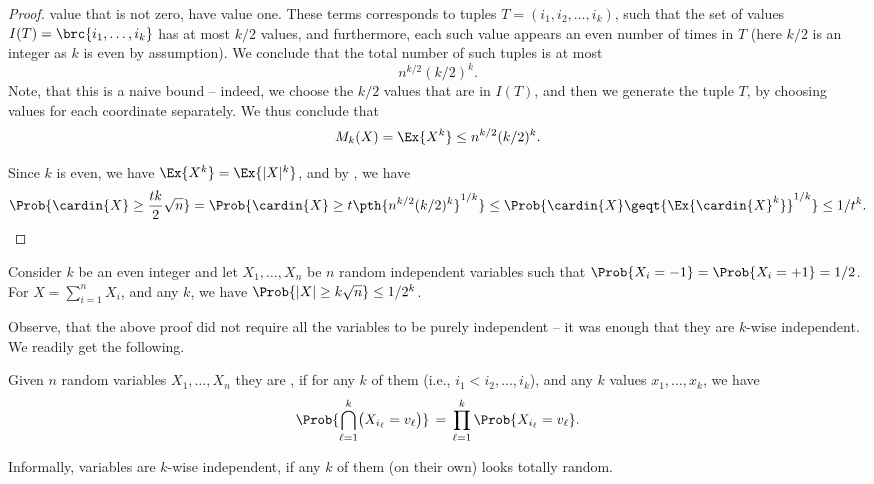 \begin{proof}
    value that is not zero, have value one. These terms corresponds to
    tuples $T = (i_1, i_2, \ldots, i_k)$, such that the set of values
    $I(T) = \brc{ i_1, \ldots, i_k}$ has at most $k/2$ values, and
    furthermore, each such value appears an even number of times in
    $T$ (here $k/2$ is an integer as $k$ is even by assumption). We
    conclude that the total number of such tuples is at most
    \[
        n^{k/2} (k/2)^k.
    \]
    Note, that this is a naive bound -- indeed, we choose the $k/2$
    values that are in $I(T)$, and then we generate the tuple $T$, by
    choosing values for each coordinate separately. We thus conclude
    that
    \begin{equation*}
        M_k(X) = \Ex{  X^{k}}%
        \leq n^{k/2} (k/2)^k.
    \end{equation*}

    Since $k$ is even, we have $\Ex{X^k} = \Ex{|X|^k}$, and by
    , we have
    \begin{align*}
      \Prob{\cardin{X} \geq \frac{tk}{2} \sqrt{n}}%
      =%
      \Prob{\cardin{X} \geq t \pth{n^{k/2} (k/2)^k}^{1/k}}
      \leq 
      \Prob{ \cardin{X} \geq%
      t {\Ex{ \bigl. {\cardin{X}}^k} }^{1/k}} \leq {1}/{t^k}.
    \end{align*}
\end{proof}


\begin{corollary}
    Consider $k$ be an even integer and let $X_1, \ldots, X_n$ be $n$
    random independent variables such that
    $\Prob{X_i=-1} = \Prob{X_i =+1} = 1/2$. For
    $X = \sum_{i=1}^n X_i$, and any $k$, we have
    $\Prob{|X| \geq k \sqrt{n}} \leq 1/2^k$.
\end{corollary}

Observe, that the above proof did not require all the variables to be
purely independent -- it was enough that they are $k$-wise
independent. We readily get the following.

\begin{defn}
    Given $n$ random variables $X_1, \ldots, X_n$ they are
    , if for any $k$ of them (i.e.,
    $i_1 < i_2, \ldots, i_k$), and any $k$ values $x_1, \ldots, x_k$,
    we have\
    \begin{equation*}
        \Prob{\Bigl. \smash{\bigcap_{\ell=1}^k} \bigl(X_{i_{\ell}} = v_\ell\bigr)}%
        \,=\,%
        \prod_{\ell=1}^k \Prob{  X_{i_{\ell}} = v_\ell }.
    \end{equation*}
\end{defn}
Informally, variables are $k$-wise independent, if any
$k$ of them (on their own) looks totally random.


